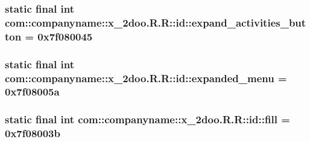 \hypertarget{classcom_1_1companyname_1_1x__2doo_1_1_r_1_1id_df967670029cb62252cfcaee4bb49dd5}{
\subsubsection[{expand\_\-activities\_\-button}]{\setlength{\rightskip}{0pt plus 5cm}static final int com::companyname::x\_\-2doo.R.R::id::expand\_\-activities\_\-button = 0x7f080045}}
\label{classcom_1_1companyname_1_1x__2doo_1_1_r_1_1id_df967670029cb62252cfcaee4bb49dd5}


\hypertarget{classcom_1_1companyname_1_1x__2doo_1_1_r_1_1id_bfd4925a654bfcbcac5954f8ef2f080d}{
\subsubsection[{expanded\_\-menu}]{\setlength{\rightskip}{0pt plus 5cm}static final int com::companyname::x\_\-2doo.R.R::id::expanded\_\-menu = 0x7f08005a}}
\label{classcom_1_1companyname_1_1x__2doo_1_1_r_1_1id_bfd4925a654bfcbcac5954f8ef2f080d}


\hypertarget{classcom_1_1companyname_1_1x__2doo_1_1_r_1_1id_e39fc827c8b43f3f5aa6e51dc207ce6c}{
\subsubsection[{fill}]{\setlength{\rightskip}{0pt plus 5cm}static final int com::companyname::x\_\-2doo.R.R::id::fill = 0x7f08003b}}
\label{classcom_1_1companyname_1_1x__2doo_1_1_r_1_1id_e39fc827c8b43f3f5aa6e51dc207ce6c}


